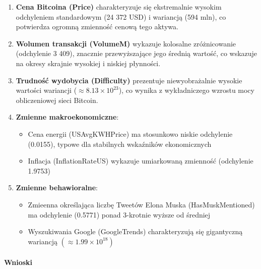\documentclass[
  11pt,
]{article}
\providecommand{\tightlist}{%
  \setlength{\itemsep}{0pt}\setlength{\parskip}{0pt}}
\begin{document}
\begin{enumerate}
\def\labelenumi{\arabic{enumi}.}
\item
  \textbf{Cena Bitcoina (Price)} charakteryzuje się ekstremalnie wysokim
  odchyleniem standardowym (24 372 USD) i wariancją (594 mln), co
  potwierdza ogromną zmienność cenową tego aktywa.
\item
  \textbf{Wolumen transakcji (VolumeM)} wykazuje kolosalne zróżnicowanie
  (odchylenie 3 409), znacznie przewyższające jego średnią wartość, co
  wskazuje na okresy skrajnie wysokiej i niskiej płynności.
\item
  \textbf{Trudność wydobycia (Difficulty)} prezentuje niewyobrażalnie
  wysokie wartości wariancji (\(\approx 8.13 \times 10^{23}\)), co
  wynika z wykładniczego wzrostu mocy obliczeniowej sieci Bitcoin.
\item
  \textbf{Zmienne makroekonomiczne}:

  \begin{itemize}
  \tightlist
  \item
    Cena energii (USAvgKWHPrice) ma stosunkowo niskie odchylenie
    (0.0155), typowe dla stabilnych wskaźników ekonomicznych
  \item
    Inflacja (InflationRateUS) wykazuje umiarkowaną zmienność
    (odchylenie 1.9753)
  \end{itemize}
\item
  \textbf{Zmienne behawioralne}:

  \begin{itemize}
  \tightlist
  \item
    Zmieenna określająca liczbę Tweetów Elona Muska (HasMuskMentioned)
    ma odchylenie (0.5771) ponad 3-krotnie wyższe od średniej
  \item
    Wyszukiwania Google (GoogleTrends) charakteryzują się gigantyczną
    wariancją \((\approx 1.99 \times 10^{18})\)
  \end{itemize}
\end{enumerate}

\paragraph{Wnioski}\label{wnioski-1}
\end{document}
